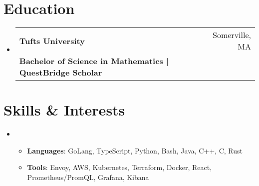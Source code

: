 \documentclass[letterpaper,11pt]{article}
\makeatletter
\newcommand{\cvitem}[1]{
  \item\small{
    {#1\vspace{-2pt}}
  }
}
\newcommand{\cvheading}[4]{
  \vspace{-2pt}\item
    \begin{tabular*}{\textwidth}[t]{l@{\extracolsep{\fill}}r}
      \textbf{#1} & #2 \\
      \small#3 & \small #4 \\
    \end{tabular*}\vspace{-9pt}
}
\newcommand{\cvheadingstart}{\begin{itemize}[leftmargin=0in, label={}]}
\newcommand{\cvheadingend}{\end{itemize}}
\newcommand{\cvitemstart}{\begin{itemize}\justifying}
\newcommand{\cvitemend}{\end{itemize}\vspace{-5pt}}
\makeatother
\begin{document}
\section{Education}
\cvheadingstart
  \cvheading
    {Tufts University}{Somerville, MA}
    {\textbf{Bachelor of Science in Mathematics | QuestBridge Scholar} }{}
\cvheadingend

\section{Skills \& Interests}
\cvheadingstart
\item
\cvitemstart
    \cvitem{\textbf{Languages}: GoLang, TypeScript, Python, Bash, Java, C++, C, Rust}
    \cvitem{\textbf{Tools}: Envoy, AWS, Kubernetes, Terraform, Docker, React, Prometheus/PromQL, Grafana, Kibana}
\cvitemend
\cvheadingend
\end{document}
